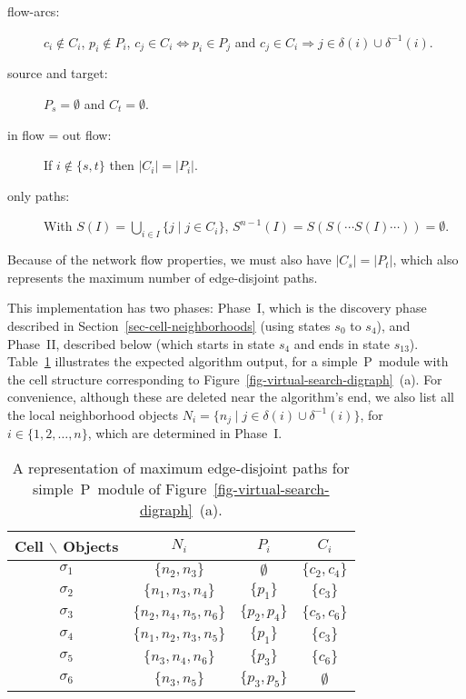 \documentclass[preliminary,copyright,creativecommons]{eptcs}
\theoremstyle{remark}
\begin{document}
\begin{minipage}{5.5in}
\begin{description}
\item[flow-arcs:] 
     $c_i \not\in C_i$, $p_i \not\in P_i$, 
     $c_j \in C_i \Leftrightarrow p_i \in P_j$ and 
     $c_j \in C_i \Rightarrow j \in \delta(i) \cup \delta^{-1}(i)$.
\item[source and target:] 
     $P_s = \emptyset$ and $C_t = \emptyset$.
\item[in flow = out flow:] If $i\not\in \{s,t\}$ then $|C_i|=|P_i|$. 
\item[only paths:] 
With $S(I)= \bigcup_{i \in I} \{j \mid  j \in C_i\}$,
$S^{n-1}(I)=S(S(\cdots S(I)\cdots))=\emptyset$.

\end{description}
\end{minipage}

\smallskip

\noindent Because of the network flow properties, we must also have $|C_s|=|P_t|$,
which also represents the maximum number of edge-disjoint paths.

This implementation has two phases: Phase~I, which is the discovery phase
described in Section~\ref{sec-cell-neighborhoods} (using states $s_0$ to $s_4$), 
and Phase~II, described below (which starts in state $s_4$ and ends in state $s_{13}$).
Table~\ref{tab-edge-output-objects} illustrates
the expected algorithm output, for a simple~P~module with the cell structure
corresponding to Figure~\ref{fig-virtual-search-digraph}~(a).
For convenience, although these are deleted near the algorithm's end,
we also list all the local neighborhood objects 
$N_i = \{n_j \mid j\in \delta(i) \cup \delta^{-1}(i)\}$, for $i \in \{1, 2, \ldots, n\}$, 
which are determined in Phase~I.

\setcounter{table}{\thefigure}
\begin{table}[ht]
\caption{A representation of maximum edge-disjoint paths for simple~P~module of
Figure~\ref{fig-virtual-search-digraph}~(a).}
\label{tab-edge-output-objects}
\begin{center}
\begin{tabular}{ | c | c | c | c | } \hline
Cell $\backslash$ Objects & $N_i$ & $P_i$ & $C_i$ \\ \hline 
$\sigma_1$ & $\{n_2, n_3\}$ & $\emptyset$ & $\{c_2, c_4\}$ \\ \hline
$\sigma_2$ & $\{n_1, n_3, n_4\}$ & $\{p_1\}$ & $\{c_3\}$ \\ \hline
$\sigma_3$ & $\{n_2, n_4, n_5, n_6\}$ & $\{p_2, p_4\}$ & $\{c_5, c_6\}$ \\ \hline
$\sigma_4$ & $\{n_1, n_2, n_3, n_5\}$ & $\{p_1\}$ & $\{c_3\}$ \\ \hline
$\sigma_5$ & $\{n_3, n_4, n_6\}$ & $\{p_3\}$ & $\{c_6\}$ \\ \hline
$\sigma_6$ & $\{n_3, n_5\}$ & $\{p_3, p_5\}$ & $\emptyset$ \\ \hline
\end{tabular}
\end{center}
\end{table}
\addtocounter{figure}{1}
\end{document}
